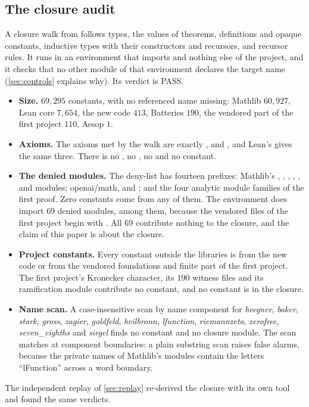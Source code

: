 \documentclass[11pt]{article}
\theoremstyle{definition}
\begin{document}
\subsection{The closure audit}\label{sec:audit}

A closure walk from  follows types, the values of theorems, definitions and opaque constants, inductive types with their constructors and recursors, and recursor rules. It runs in an environment that imports  and nothing else of the project, and it checks that no other module of that environment declares the target name (\cref{sec:controls} explains why). Its verdict is PASS.
\begin{itemize}[nosep]
\item \textbf{Size.} $69{,}295$ constants, with no referenced name missing: Mathlib $60{,}927$, Lean core $7{,}654$, the new code $413$, Batteries $190$, the vendored part of the first project $110$, Aesop $1$.
\item \textbf{Axioms.} The axioms met by the walk are exactly ,  and , and Lean's  gives the same three. There is no , no , no  and no  constant.
\item \textbf{The denied modules.} The deny-list has fourteen prefixes: Mathlib's , , , , ,  and  modules; openai/math,  and ; and the four analytic module families of the first proof. Zero constants come from any of them. The environment does import $69$ denied modules,  among them, because the vendored files of the first project begin with . All $69$ contribute nothing to the closure, and the claim of this paper is about the closure.
\item \textbf{Project constants.} Every constant outside the libraries is from the new code or from the vendored foundations and finite part of the first project. The first project's Kronecker character, its $190$ witness files and its ramification module contribute no constant, and no  constant is in the closure.
\item \textbf{Name scan.} A case-insensitive scan by name component for \emph{heegner}, \emph{baker}, \emph{stark}, \emph{gross}, \emph{zagier}, \emph{goldfeld}, \emph{heilbronn}, \emph{lfunction}, \emph{riemannzeta}, \emph{zerofree}, \emph{seven\_eighths} and \emph{siegel} finds no constant and no closure module. The scan matches at component boundaries: a plain substring scan raises false alarms, because the private names of Mathlib's  modules contain the letters ``lFunction'' across a word boundary.
\end{itemize}
The independent replay of \cref{sec:replay} re-derived the closure with its own tool and found the same verdicts.
\end{document}
